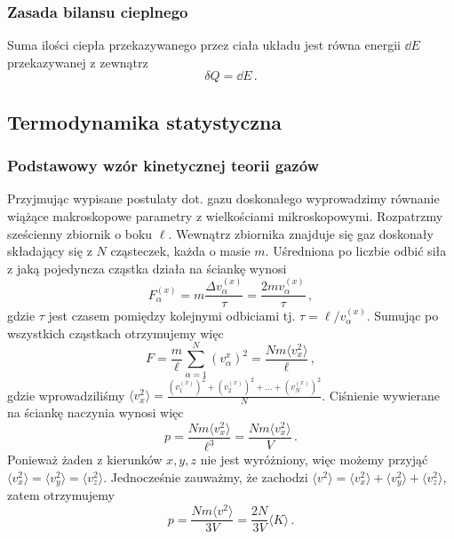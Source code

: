 \documentclass[../main.tex]{subfiles}
\begin{document}
\subsubsection{Zasada bilansu cieplnego}
Suma ilości ciepła przekazywanego przez ciała układu jest równa energii \(\dd{E}\) przekazywanej z
zewnątrz
\begin{equation*}
    \delta Q= \dd{E}\,.
\end{equation*}

\subsection{Termodynamika statystyczna}
\subsubsection{Podstawowy wzór kinetycznej teorii gazów}
Przyjmując wypisane postulaty dot. gazu doskonałego wyprowadzimy równanie wiążące makroskopowe
parametry z wielkościami mikroskopowymi. Rozpatrzmy sześcienny zbiornik o boku \(\ell\). Wewnątrz
zbiornika znajduje się gaz doskonały składający się z \(N\) cząsteczek, każda o masie \(m\).
Uśredniona po liczbie odbić siła z jaką pojedyncza cząstka działa na ściankę wynosi
\begin{equation*}
    F_\alpha^{(x)}=m\frac{\Delta v_\alpha^{(x)}}{\tau}=\frac{2mv_\alpha^{(x)}}{\tau}\,,
\end{equation*}
gdzie \(\tau\) jest czasem pomiędzy kolejnymi odbiciami tj. \(\tau=\ell/v_\alpha^{(x)}\). Sumując po
wszystkich cząstkach otrzymujemy więc
\begin{equation*}
    F=\frac{m}{\ell}\sum_{\alpha=1}^{N}(v_\alpha^{x})^2=\frac{Nm\langle v_x^2\rangle}{\ell}\,,
\end{equation*}
gdzie wprowadziliśmy \(\langle v_x^2\rangle
=\frac{(v_1^{(x)})^2+(v_2^{(x)})^2+...+(v_N^{(x)})^2}{N}\). Ciśnienie wywierane na ściankę naczynia
wynosi więc
\begin{equation*}
    p=\frac{Nm\langle v_x^2\rangle }{\ell ^3}=\frac{Nm\langle v_x^2\rangle }{V}\,.
\end{equation*}
Ponieważ żaden z kierunków \(x,y,z\) nie jest wyróżniony, więc możemy przyjąć \(\langle
v_x^2\rangle=\langle v_y^2\rangle=\langle v_z^2\rangle\). Jednocześnie zauważmy, że zachodzi
\(\langle v^2\rangle=\langle v_x^2\rangle+\langle v_y^2\rangle+\langle v_z^2\rangle\), zatem
otrzymujemy
\begin{equation*}
    p=\frac{Nm\langle v^2\rangle}{3V}=\frac{2N}{3V}\langle K\rangle\,.
\end{equation*}
\end{document}
